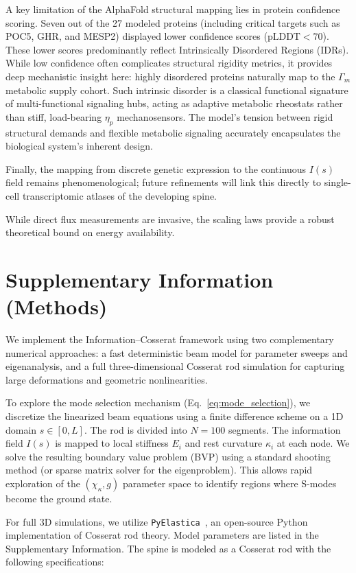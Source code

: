 \documentclass[11pt]{article}
\begin{document}
A key limitation of the AlphaFold structural mapping lies in protein confidence scoring. Seven out of the 27 modeled proteins (including critical targets such as POC5, GHR, and MESP2) displayed lower confidence scores ($\text{pLDDT} < 70$). These lower scores predominantly reflect Intrinsically Disordered Regions (IDRs). While low confidence often complicates structural rigidity metrics, it provides deep mechanistic insight here: highly disordered proteins naturally map to the $\Gamma_m$ metabolic supply cohort. Such intrinsic disorder is a classical functional signature of multi-functional signaling hubs, acting as adaptive metabolic rheostats rather than stiff, load-bearing $\eta_p$ mechanosensors. The model's tension between rigid structural demands and flexible metabolic signaling accurately encapsulates the biological system's inherent design.

Finally, the mapping from discrete genetic expression to the continuous $I(s)$ field remains phenomenological; future refinements will link this directly to single-cell transcriptomic atlases of the developing spine.

While direct flux measurements are invasive, the scaling laws provide a robust theoretical bound on energy availability.

\section*{Supplementary Information (Methods)}
We implement the Information--Cosserat framework using two complementary numerical approaches: a fast deterministic beam model for parameter sweeps and eigenanalysis, and a full three-dimensional Cosserat rod simulation for capturing large deformations and geometric nonlinearities.



To explore the mode selection mechanism (Eq.~\ref{eq:mode_selection}), we discretize the linearized beam equations using a finite difference scheme on a 1D domain $s \in [0, L]$. The rod is divided into $N=100$ segments. The information field $I(s)$ is mapped to local stiffness $E_i$ and rest curvature $\kappa_{i}$ at each node. We solve the resulting boundary value problem (BVP) using a standard shooting method (or sparse matrix solver for the eigenproblem). This allows rapid exploration of the $(\chi_\kappa, g)$ parameter space to identify regions where S-modes become the ground state.



For full 3D simulations, we utilize \texttt{PyElastica}~\cite{pyelastica_zenodo,gazzola2018forward}, an open-source Python implementation of Cosserat rod theory. Model parameters are listed in the Supplementary Information. The spine is modeled as a Cosserat rod with the following specifications:
\end{document}
